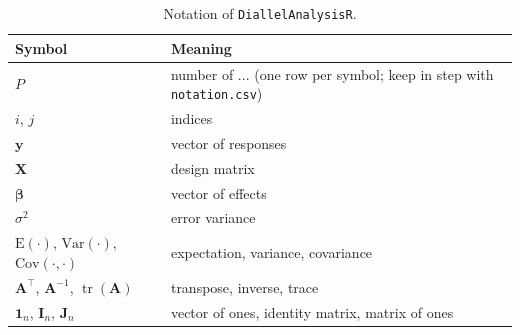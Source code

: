 \begin{longtable}{>{\raggedright\arraybackslash}p{}>{\raggedright\arraybackslash}p{}}
\caption{Notation of \texttt{DiallelAnalysisR}.}\\
\toprule
Symbol & Meaning\\
\midrule
\endhead
$P$ & number of ... (one row per symbol; keep in step with \texttt{notation.csv})\\
$i$, $j$ & indices\\
$\mathbf{y}$ & vector of responses\\
$\mathbf{X}$ & design matrix\\
$\boldsymbol{\beta}$ & vector of effects\\
$\sigma^2$ & error variance\\
$\mathrm{E}(\cdot)$, $\mathrm{Var}(\cdot)$, $\mathrm{Cov}(\cdot,\cdot)$ & expectation, variance, covariance\\
$\mathbf{A}^\top$, $\mathbf{A}^{-1}$, $\operatorname{tr}(\mathbf{A})$ & transpose, inverse, trace\\
$\mathbf{1}_n$, $\mathbf{I}_n$, $\mathbf{J}_n$ & vector of ones, identity matrix, matrix of ones\\
\bottomrule
\end{longtable}
